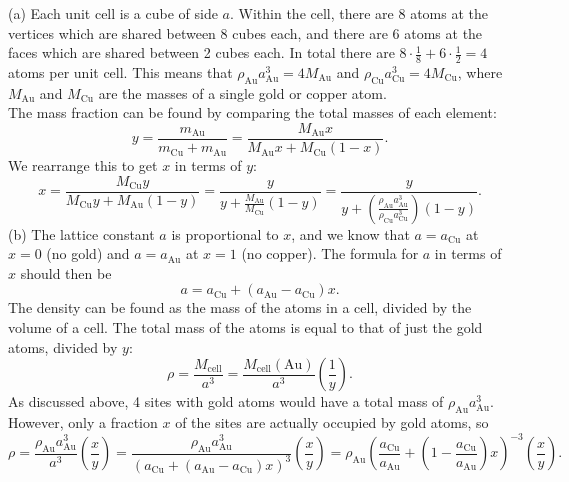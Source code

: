 \documentclass[../TST.tex]{subfiles}
\begin{document}
\ifprob \else
	\begin{solution} (a) Each unit cell is a cube of side $a$. Within the cell, there are 8 atoms at the vertices which are shared between 8 cubes each, and there are 6 atoms at the faces which are shared between 2 cubes each. In total there are $8\cdot \frac{1}{8}+ 6\cdot \frac{1}{2}=4$ atoms per unit cell. This means that $\rho_\mathrm{Au}a_\mathrm{Au}^3=4M_\mathrm{Au}$ and $\rho_\mathrm{Cu}a_\mathrm{Cu}^3=4M_\mathrm{Cu}$, where $M_\mathrm{Au}$ and $M_\mathrm{Cu}$ are the masses of a single gold or copper atom. \\[5pt]
		The mass fraction can be found by comparing the total masses of each element:
		\begin{equation*}
		y=\frac{m_\mathrm{Au}}{m_\mathrm{Cu}+m_\mathrm{Au}}= \frac{M_\mathrm{Au}x}{M_\mathrm{Au}x+M_\mathrm{Cu}(1-x)}
		.
		\end{equation*}
We rearrange this to get $x$ in terms of $y$:
\begin{equation*}
	x=\frac{M_\mathrm{Cu}y}{M_\mathrm{Cu}y+M_\mathrm{Au}(1-y)}=\frac{y}{y+\frac{M_\mathrm{Au}}{M_\mathrm{Cu}}(1-y)}=\boxed{\frac{y}{y+\left(\frac{\rho_\mathrm{Au}a_\mathrm{Au}^3}{\rho_\mathrm{Cu}a_\mathrm{Cu}^3}\right) (1-y)}.}
\end{equation*}
(b) The lattice constant $a$ is proportional to $x$, and we know that $a=a_\mathrm{Cu}$ at $x=0$ (no gold) and $a=a_\mathrm{Au}$ at $x=1$ (no copper). The formula for $a$ in terms of $x$ should then be
\begin{equation*}
a=a_\mathrm{Cu}+(a_\mathrm{Au}-a_\mathrm{Cu})x
.
\end{equation*}
The density can be found as the mass of the atoms in a cell, divided by the volume of a cell.  The total mass of the atoms is equal to that of just the gold atoms, divided by $y$:
\begin{equation*}
\rho = \frac{M_\mathrm{cell}}{a^3}= \frac{M_\mathrm{cell}(\mathrm{Au})}{a^3}\left(\frac{1}{y}\right) 
.
\end{equation*}
As discussed above, 4 sites with gold atoms would have a total mass of $\rho_\mathrm{Au}a_\mathrm{Au}^3$. However, only a fraction $x$ of the sites are actually occupied by gold atoms, so
\begin{equation*}
	\rho = \frac{\rho_\mathrm{Au}a_\mathrm{Au}^3}{a^3}\left(\frac{x}{y}\right)  =\frac{\rho_\mathrm{Au}a_\mathrm{Au}^3}{(a_\mathrm{Cu}+(a_\mathrm{Au}-a_\mathrm{Cu})x)^3}\left(\frac{x}{y} \right) =\rho_\mathrm{Au}\left(\frac{a_\mathrm{Cu}}{a_\mathrm{Au}}+ \left(1-\frac{a_\mathrm{Cu}}{a_\mathrm{Au}}\right)x \right)^{-3}\left(\frac{x}{y} \right).

\end{equation*}
\end{solution}
\end{document}
